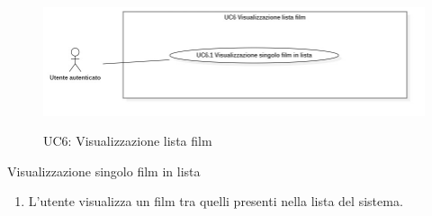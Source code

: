 \begin{figure}[!ht] 
  \centering 
  \includegraphics[width=0.9\columnwidth, alt={Caso d'uso relativo alla visualizzazione della lista dei film dell'utente}]{immagini/usecase/UC6.jpg}
  \caption{UC6: Visualizzazione lista film}\label{fig:uc:visualizzazione-lista-film}
\end{figure}

\begin{usecase}{6.1}{Visualizzazione singolo film in lista}\label{uc:visualizzazione-singolo-lista-film}
  \usecasemain{}
  
  \begin{enumerate}
    \item L'utente visualizza un film tra quelli presenti nella lista del sistema.
  \end{enumerate}
\end{usecase}


